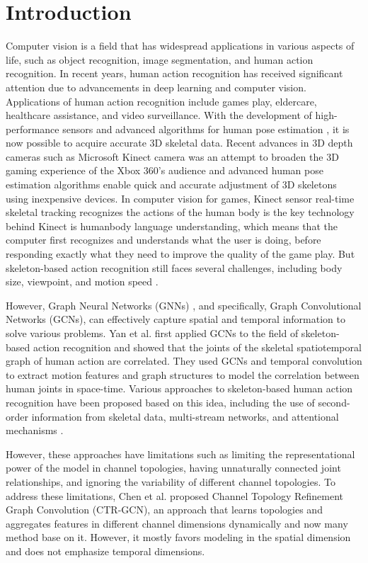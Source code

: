 \documentclass{bmvc2k}
\begin{document}
\section{Introduction}
Computer vision is a field that has widespread applications in various aspects of life, such as object recognition, image segmentation, and human action recognition. In recent years, human action recognition has received significant attention due to advancements in deep learning and computer vision. Applications of human action recognition include games play, eldercare, healthcare assistance, and video surveillance. With the development of high-performance sensors and advanced algorithms for human pose estimation \cite{Fang_2017_ICCV}, it is now possible to acquire accurate 3D skeletal data. Recent advances in 3D depth cameras such as Microsoft Kinect camera \cite{Kinect_2017_ICCV} was an attempt to broaden the 3D gaming experience of the Xbox 360's audience and advanced human pose estimation algorithms \cite{Cao_2019_IEEE} enable quick and accurate adjustment of 3D skeletons using inexpensive devices.
In computer vision for games, Kinect sensor real-time skeletal tracking recognizes the actions of the human body is the key technology behind Kinect is humanbody language understanding, which means that the computer first recognizes and understands what the user is doing, before responding exactly what they need to improve the quality of the game play. But skeleton-based action recognition still faces several challenges, including body size, viewpoint, and motion speed \cite{Yan_2018_AAAI,Aggarwal_2011,Ren2020-eh}.


However, Graph Neural Networks (GNNs) \cite{graphnn2018}, and specifically, Graph Convolutional Networks (GCNs)\cite{SGCN2019}, can effectively capture spatial and temporal information to solve various problems. Yan et al. \cite{Yan_2018_AAAI} first applied GCNs to the field of skeleton-based action recognition and showed that the joints of the skeletal spatiotemporal graph of human action are correlated. They used GCNs and temporal convolution \cite{temporalconv2018} to extract motion features and graph structures to model the correlation between human joints in space-time. Various approaches to skeleton-based human action recognition have been proposed based on this idea, including the use of second-order information from skeletal data, multi-stream networks, and attentional mechanisms \cite{Shi2018-nh,Cheng_2020_CVPR,Qin2021-wu,Plizzari2020-lc,Zhang2019-oa}.

However, these approaches have limitations such as limiting the representational power of the model in channel topologies, having unnaturally connected joint relationships, and ignoring the variability of different channel topologies. To address these limitations, Chen et al. \cite{Chen2021-lx} proposed Channel Topology Refinement Graph Convolution (CTR-GCN), an approach that learns topologies and aggregates features in different channel dimensions dynamically and now many method \cite{Cheng_2020_CVPR,Fanfan_2020,Zhan_Chen2022} base on it. However, it mostly favors modeling in the spatial dimension and does not emphasize temporal dimensions. 
\end{document}
